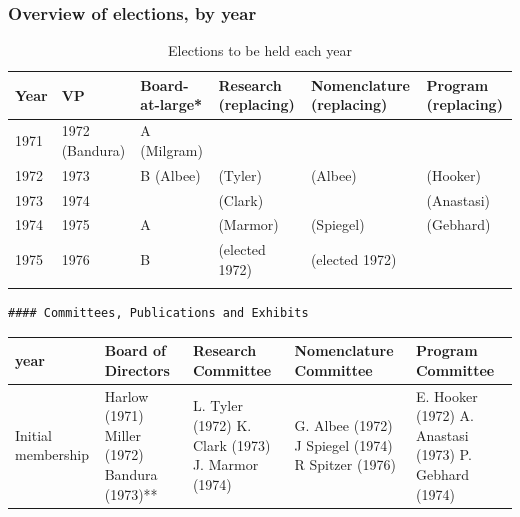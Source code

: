 \begin{refsection}
\subsubsection{Overview of elections, by year}
\label{overviewofelectionsbyyear}

 \begin{longtable}[!t]{ | p{1cm} | p{2cm} | p{1cm} |  p{2cm} | p{2cm} | p{2cm} |}
\hline
Year&
VP&
Board-at-large*&
Research (replacing)&
Nomenclature
(replacing)&
Program
(replacing)\\ \hline
1971&
1972 (Bandura)&
A (Milgram)&
&
&
\\
1972&
1973 &
B (Albee)&
(Tyler)&
(Albee)&
(Hooker)\\
1973&
1974&
&
(Clark)&
&
(Anastasi)\\
1974&
1975&
A&
(Marmor)&
(Spiegel)&
(Gebhard)\\
1975&
1976&
B&
(elected 1972)&

(elected 1972)\\ \hline
\caption{Elections to be held each year}
\label{table: elections}
\end{longtable}

\begin{verbatim}
#### Committees, Publications and Exhibits
\end{verbatim}

 \begin{longtable}[!t]{ | p{1cm} | p{2cm} | p{1cm} |  p{10cm} | p{2cm} | }
\hline
year&
Board of Directors&
Research Committee&
Nomenclature Committee&
Program Committee\\ \hline
Initial membership&
Harlow (1971)\newline
Miller (1972)\newline
Bandura (1973)\newline
[A: Milgram]*\newline
[B: Albee]*&
L. Tyler (1972)\newline
K. Clark (1973)\newline
J. Marmor (1974)&
G. Albee (1972)\newline
J Spiegel (1974)\newline
R Spitzer (1976)&
E. Hooker (1972)\newline
A. Anastasi (1973)\newline
P. Gebhard (1974)\\


\end{longtable}
\end{refsection}

